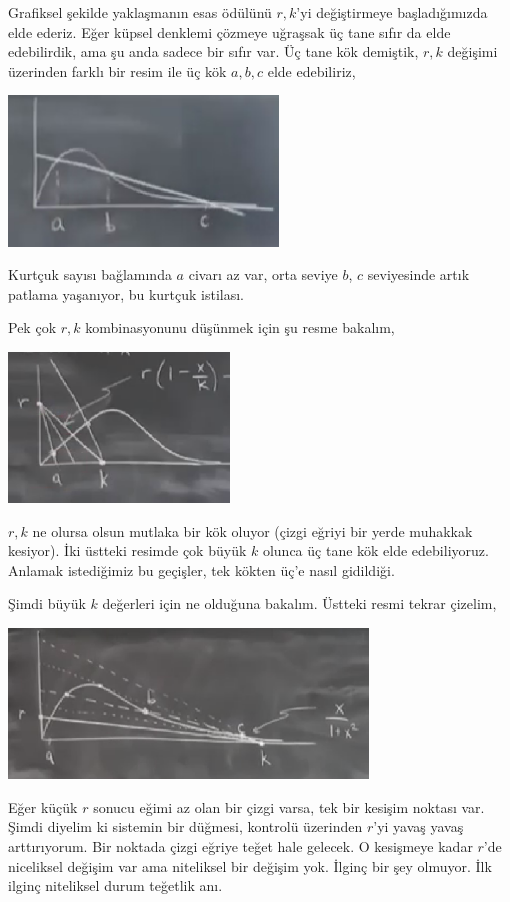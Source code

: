 \documentclass[12pt,fleqn]{article}\usepackage{../../common}
\begin{document}
Grafiksel şekilde yaklaşmanın esas ödülünü $r,k$'yi değiştirmeye başladığımızda
elde ederiz. Eğer küpsel denklemi çözmeye uğraşsak üç tane sıfır da elde
edebilirdik, ama şu anda sadece bir sıfır var. Üç tane kök demiştik, $r,k$
değişimi üzerinden farklı bir resim ile üç kök $a,b,c$ elde edebiliriz,

\includegraphics[height=4cm]{04_05.png}

Kurtçuk sayısı bağlamında $a$ civarı az var, orta seviye $b$, $c$ seviyesinde
artık patlama yaşanıyor, bu kurtçuk istilası. 

Pek çok $r,k$ kombinasyonunu düşünmek için şu resme bakalım,

\includegraphics[height=4cm]{04_06.png}

$r,k$ ne olursa olsun mutlaka bir kök oluyor (çizgi eğriyi bir yerde muhakkak
kesiyor). İki üstteki resimde çok büyük $k$ olunca üç tane kök elde
edebiliyoruz. Anlamak istediğimiz bu geçişler, tek kökten üç'e nasıl gidildiği. 

Şimdi büyük $k$ değerleri için ne olduğuna bakalım. Üstteki resmi tekrar
çizelim,

\includegraphics[height=4cm]{04_07.png}

Eğer küçük $r$ sonucu eğimi az olan bir çizgi varsa, tek bir kesişim noktası
var. Şimdi diyelim ki sistemin bir düğmesi, kontrolü üzerinden $r$'yi yavaş
yavaş arttırıyorum. Bir noktada çizgi eğriye teğet hale gelecek. O kesişmeye
kadar $r$'de niceliksel değişim var ama niteliksel bir değişim yok. İlginç bir
şey olmuyor. İlk ilginç niteliksel durum teğetlik anı.
\end{document}
